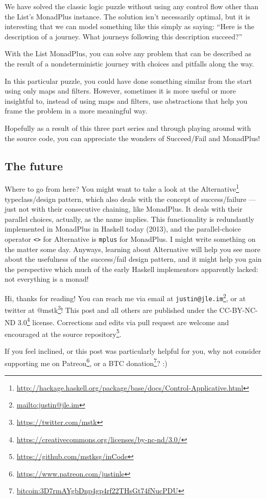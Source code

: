 \documentclass[]{article}
\renewcommand{\href}[2]{#2\footnote{\url{#1}}}
\begin{document}
We have solved the classic logic puzzle without using any control flow other
than the List's MonadPlus instance. The solution isn't necessarily optimal, but
it is interesting that we can model something like this simply as saying: ``Here
is the description of a journey. What journeys following this description
succeed?''

With the List MonadPlus, you can solve any problem that can be described as the
result of a nondeterministic journey with choices and pitfalls along the way.

In this particular puzzle, you could have done something similar from the start
using only maps and filters. However, sometimes it is more useful or more
insightful to, instead of using maps and filters, use abstractions that help you
frame the problem in a more meaningful way.

Hopefully as a result of this three part series and through playing around with
the source code, you can appreciate the wonders of Succeed/Fail and MonadPlus!

\hypertarget{the-future}{%
\subsection{The future}\label{the-future}}

Where to go from here? You might want to take a look at the
\href{http://hackage.haskell.org/package/base/docs/Control-Applicative.html}{Alternative}
typeclass/design pattern, which also deals with the concept of success/failure
--- just not with their consecutive chaining, like MonadPlus. It deals with
their parallel choices, actually, as the name implies. This functionality is
redundantly implemented in MonadPlus in Haskell today (2013), and the
parallel-choice operator \texttt{\textless{}\textbar{}\textgreater{}} for
Alternative is \texttt{mplus} for MonadPlus. I might write something on the
matter some day. Anyways, learning about Alternative will help you see more
about the usefulness of the success/fail design pattern, and it might help you
gain the perspective which much of the early Haskell implementors apparently
lacked: not everything is a monad!

Hi, thanks for reading! You can reach me via email at
\href{mailto:justin@jle.im}{\nolinkurl{justin@jle.im}}, or at twitter at
\href{https://twitter.com/mstk}{@mstk}! This post and all others are published
under the \href{https://creativecommons.org/licenses/by-nc-nd/3.0/}{CC-BY-NC-ND
3.0} license. Corrections and edits via pull request are welcome and encouraged
at \href{https://github.com/mstksg/inCode}{the source repository}.

If you feel inclined, or this post was particularly helpful for you, why not
consider \href{https://www.patreon.com/justinle}{supporting me on Patreon}, or a
\href{bitcoin:3D7rmAYgbDnp4gp4rf22THsGt74fNucPDU}{BTC donation}? :)
\end{document}
